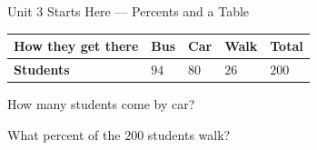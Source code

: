 \documentclass[12pt]{article}
\begin{document}
\begin{notesbox}{Unit 3 Starts Here --- Percents and a Table}
\begin{enumerate}[leftmargin=1.8em, itemsep=22pt, topsep=10pt]
        \vspace{4pt}
        \renewcommand{\arraystretch}{1.8}
        \begin{tabularx}{\linewidth}{@{} X Y Y Y Y @{}}
        \toprule
        \textbf{How they get there} & \textbf{Bus} & \textbf{Car} & \textbf{Walk} & \textbf{Total} \\
        \midrule
        \textbf{Students} & $94$ & $80$ & $26$ & $200$ \\
        \bottomrule
        \end{tabularx}

        \vspace{10pt}
        How many students come by car? 

        \vspace{12pt}
        What percent of the $200$ students walk? 

\end{enumerate}
\end{notesbox}
\end{document}
